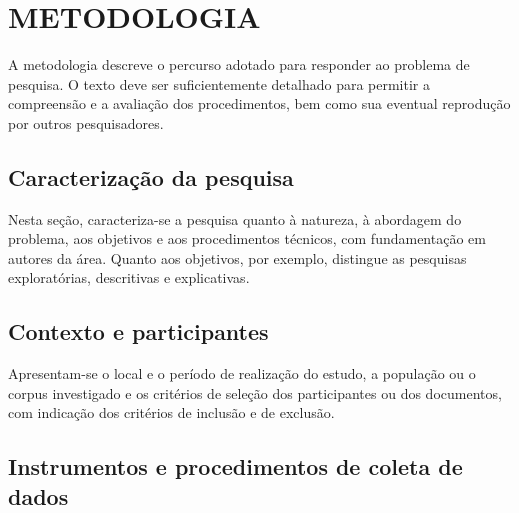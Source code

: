 
\chapter{METODOLOGIA}
\label{cap:metodologia}

A metodologia descreve o percurso adotado para responder ao problema de pesquisa. O texto deve ser suficientemente detalhado para permitir a compreensão e a avaliação dos procedimentos, bem como sua eventual reprodução por outros pesquisadores.

\section{Caracterização da pesquisa}
\label{sec:caracterizacao}

Nesta seção, caracteriza-se a pesquisa quanto à natureza, à abordagem do problema, aos objetivos e aos procedimentos técnicos, com fundamentação em autores da área. Quanto aos objetivos, por exemplo,  distingue as pesquisas exploratórias, descritivas e explicativas.

\section{Contexto e participantes}
\label{sec:participantes}

Apresentam-se o local e o período de realização do estudo, a população ou o corpus investigado e os critérios de seleção dos participantes ou dos documentos, com indicação dos critérios de inclusão e de exclusão.

\section{Instrumentos e procedimentos de coleta de dados}
\label{sec:coleta}

